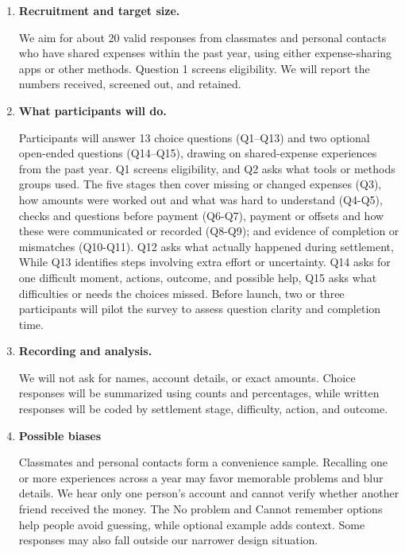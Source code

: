 \documentclass[letterpaper]{jdf}
\begin{document}
\begin{enumerate}[label=\arabic*)]

\item \textbf{Recruitment and target size.}
    
We aim for about 20 valid responses from classmates and personal contacts who have shared expenses within the past year, using either expense-sharing apps or other methods.  Question 1 screens eligibility. We will report the numbers received, screened out, and retained.

\item \textbf{What participants will do.}

Participants will answer 13 choice questions (Q1–Q13) and two optional open-ended questions (Q14–Q15), drawing on shared-expense experiences from the past year.  Q1 screens eligibility, and Q2 asks what tools or methods groups used. The five stages then cover missing or changed expenses (Q3), how amounts were worked out and what was hard to understand (Q4-Q5), checks and questions before payment (Q6-Q7), payment or offsets and how these were communicated or recorded (Q8-Q9); and evidence of completion or mismatches (Q10-Q11). Q12 asks what actually happened during settlement, While Q13 identifies steps involving extra effort or uncertainty. Q14 asks for one difficult moment, actions, outcome, and possible help, Q15 asks what difficulties or needs the choices missed. Before launch, two or three participants will pilot the survey to assess question clarity and completion time.

\item \textbf{Recording and analysis.}

We will not ask for names, account details, or exact amounts. Choice responses will be summarized using counts and percentages, while written responses will be coded by settlement stage, difficulty, action, and outcome.

\item \textbf{Possible biases}

Classmates and personal contacts form a convenience sample. Recalling one or more experiences across a year may favor memorable problems and blur details. We hear only one person's account and cannot verify whether another friend received the money. The No problem and Cannot remember options help people avoid guessing, while optional example adds context. Some responses may also fall outside our narrower design situation.


\end{enumerate}
\end{document}

